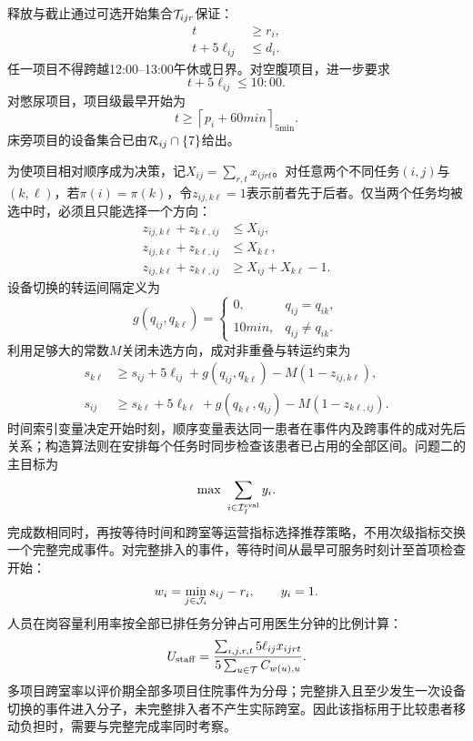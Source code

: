 释放与截止通过可选开始集合$\mathcal{T}_{ijr}$保证：
\begin{align}
t&\ge r_i,\\
t+5\ell_{ij}&\le d_i.
\end{align}
任一项目不得跨越12:00--13:00午休或日界。对空腹项目，进一步要求
\begin{equation}
t+5\ell_{ij}\le 10{:}00.
\end{equation}
对憋尿项目，项目级最早开始为
\begin{equation}
t\ge \left\lceil p_i+60\unit{min}\right\rceil_{5\mathrm{min}}.
\end{equation}
床旁项目的设备集合已由$\mathcal{R}_{ij}\cap\{7\}$给出。

为使项目相对顺序成为决策，记$X_{ij}=\sum_{r,t}x_{ijrt}$。对任意两个不同任务$(i,j)$与$(k,\ell)$，若$\pi(i)=\pi(k)$，令$z_{ij,k\ell}=1$表示前者先于后者。仅当两个任务均被选中时，必须且只能选择一个方向：
\begin{align}
z_{ij,k\ell}+z_{k\ell,ij}&\le X_{ij},\\
z_{ij,k\ell}+z_{k\ell,ij}&\le X_{k\ell},\\
z_{ij,k\ell}+z_{k\ell,ij}&\ge X_{ij}+X_{k\ell}-1.
\end{align}
设备切换的转运间隔定义为
\begin{equation}
g(q_{ij},q_{k\ell})=
\begin{cases}
0,&q_{ij}=q_{ik},\\
10\unit{min},&q_{ij}\ne q_{ik}.
\end{cases}
\end{equation}
利用足够大的常数$M$关闭未选方向，成对非重叠与转运约束为
\begin{align}
s_{k\ell}&\ge s_{ij}+5\ell_{ij}+g(q_{ij},q_{k\ell})-M(1-z_{ij,k\ell}),\\
s_{ij}&\ge s_{k\ell}+5\ell_{k\ell}+g(q_{k\ell},q_{ij})-M(1-z_{k\ell,ij}).
\end{align}
时间索引变量决定开始时刻，顺序变量表达同一患者在事件内及跨事件的成对先后关系；构造算法则在安排每个任务时同步检查该患者已占用的全部区间。问题二的主目标为
\begin{equation}
\max\ \sum_{i\in\I_I^{\mathrm{eval}}}y_i.
\end{equation}
完成数相同时，再按等待时间和跨室等运营指标选择推荐策略，不用次级指标交换一个完整完成事件。对完整排入的事件，等待时间从最早可服务时刻计至首项检查开始：
\begin{equation}
w_i=\min_{j\in\mathcal{J}_i}s_{ij}-r_i,\qquad y_i=1.
\end{equation}
人员在岗容量利用率按全部已排任务分钟占可用医生分钟的比例计算：
\begin{equation}
U_{\mathrm{staff}}
=\frac{\sum_{i,j,r,t}5\ell_{ij}x_{ijrt}}
{5\sum_{u\in\mathcal{T}}C_{w(u),u}}.
\end{equation}
多项目跨室率以评价期全部多项目住院事件为分母；完整排入且至少发生一次设备切换的事件进入分子，未完整排入者不产生实际跨室。因此该指标用于比较患者移动负担时，需要与完整完成率同时考察。

